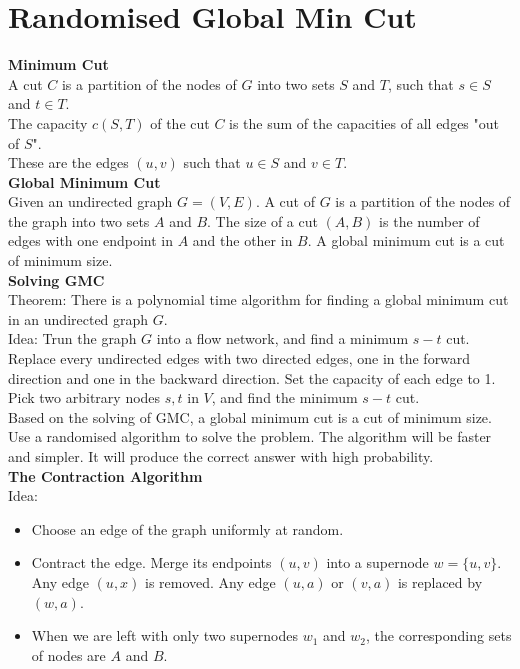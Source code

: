 \documentclass[onecolumn]{report}
\begin{document}
\section{Randomised Global Min Cut}
\textbf{Minimum Cut}\\
A cut $C$ is a partition of the nodes of $G$ into two sets $S$ and $T$, such that $s \in S$ and $t \in T$.\\
The capacity $c(S,T)$ of the cut $C$ is the sum of the capacities of all edges "out of $S$".\\
These are the edges $(u,v)$ such that $u \in S$ and $v \in T$.\\
\textbf{Global Minimum Cut}\\
Given an undirected graph $G=(V,E)$. A cut of $G$ is a partition of the nodes of the graph into two sets $A$ and $B$. The size of a cut $(A,B)$ is the number of edges with one endpoint in $A$ and the other in $B$. A global minimum cut is a cut of minimum size.\\
\textbf{Solving GMC}\\
Theorem: There is a polynomial time algorithm for finding a global minimum cut in an undirected graph $G$.\\
Idea: Trun the graph $G$ into a flow network, and find a minimum $s-t$ cut.\\
Replace every undirected edges with two directed edges, one in the forward direction and one in the backward direction. Set the capacity of each edge to 1.\\
Pick two arbitrary nodes $s,t$ in $V$, and find the minimum $s-t$ cut.\\
\noindent
Based on the solving of GMC, a global minimum cut is a cut of minimum size.\\
Use a randomised algorithm to solve the problem. The algorithm will be faster and simpler. It will produce the correct answer with high probability.\\
\textbf{The Contraction Algorithm}\\
Idea:
\begin{itemize}
    \item Choose an edge of the graph uniformly at random.
    \item Contract the edge.
    \subitem Merge its endpoints $(u,v)$ into a supernode $w=\{u,v\}$.
    \subitem Any edge $(u,x)$ is removed.
    \subitem Any edge $(u,a)$ or $(v,a)$ is replaced by $(w,a)$.
    \item When we are left with only two supernodes $w_1$ and $w_2$, the corresponding sets of nodes are $A$ and $B$.
\end{itemize}
\end{document}
